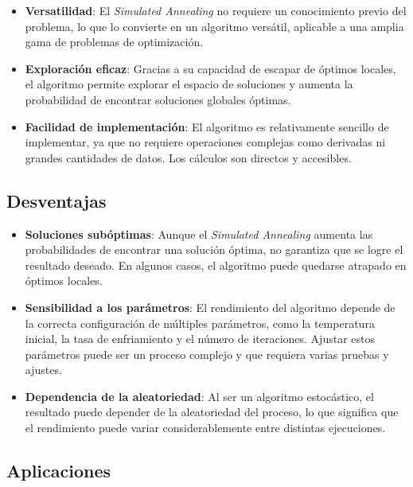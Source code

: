 \documentclass[12pt,twoside]{article}
\begin{document}
	\begin{itemize}
		\item \textbf{Versatilidad}: El \textit{Simulated Annealing} no requiere un conocimiento previo del problema, lo que lo convierte en un algoritmo versátil, aplicable a una amplia gama de problemas de optimización.
		
		\item \textbf{Exploración eficaz}: Gracias a su capacidad de escapar de óptimos locales, el algoritmo permite explorar el espacio de soluciones y aumenta la probabilidad de encontrar soluciones globales óptimas.
		
		\item \textbf{Facilidad de implementación}: El algoritmo es relativamente sencillo de implementar, ya que no requiere operaciones complejas como derivadas ni grandes cantidades de datos. Los cálculos son directos y accesibles.
	\end{itemize}
	
	\subsection{Desventajas}
	
	\begin{itemize}
		\item \textbf{Soluciones subóptimas}: Aunque el \textit{Simulated Annealing} aumenta las probabilidades de encontrar una solución óptima, no garantiza que se logre el resultado deseado. En algunos casos, el algoritmo puede quedarse atrapado en óptimos locales.
		
		\item \textbf{Sensibilidad a los parámetros}: El rendimiento del algoritmo depende de la correcta configuración de múltiples parámetros, como la temperatura inicial, la tasa de enfriamiento y el número de iteraciones. Ajustar estos parámetros puede ser un proceso complejo y que requiera varias pruebas y ajustes.
		
		\item \textbf{Dependencia de la aleatoriedad}: Al ser un algoritmo estocástico, el resultado puede depender de la aleatoriedad del proceso, lo que significa que el rendimiento puede variar considerablemente entre distintas ejecuciones.
	\end{itemize}
	
	\subsection{Aplicaciones}
	
\end{document}
